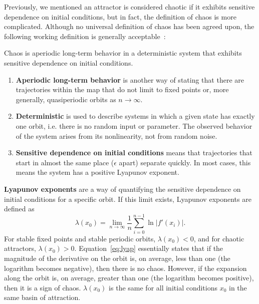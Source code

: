 Previously, we mentioned an attractor is considered chaotic if it
exhibits sensitive dependence on initial conditions, but in fact, the
definition of chaos is more complicated. Although no universal definition of chaos has been
agreed upon, the following working definition is generally acceptable~\cite{strogatz}:
\begin{singlespace}
\begin{definition}
Chaos is aperiodic long-term behavior in a deterministic
  system that exhibits sensitive dependence on initial conditions.
\end{definition}
\end{singlespace}
\begin{enumerate}
\item \textbf{Aperiodic long-term behavior} is another way of stating
  that there are trajectories within the map that do not limit to
  fixed points or, more generally, quasiperiodic orbits as $n \to \infty$.
\item \textbf{Deterministic} is used to describe systems in which a
  given state has exactly one orbit, i.e. there is no random input or parameter. The observed behavior of the
  system arises from its nonlinearity, not from random noise.
\item \textbf{Sensitive dependence on initial conditions} means that
  trajectories that start in almost the same place ($\epsilon$ apart)
  separate quickly. In most cases, this means the system has a
  positive Lyapunov exponent.
\end{enumerate}

\textbf{Lyapunov exponents} are a way of quantifying the sensitive
dependence on initial conditions for a specific orbit. If this limit
exists, Lyapunov exponents are defined as 
\begin{equation}\label{eq:lyap}
\lambda(x_0) = \lim_{n \to \infty} \frac{1}{n} \sum_{i=0}^{n-1} \ln |f'(x_i)|.
\end{equation}
For stable fixed points and stable periodic orbits, $\lambda(x_0) < 0$,
and for chaotic attractors, $\lambda(x_0)>0$. Equation~\ref{eq:lyap} essentially states that if the magnitude of the
derivative on the orbit is, on average, less than one (the logarithm
becomes negative), then there is no chaos. However, if the expansion
along the orbit is, on average, greater than one (the logarithm becomes positive), then it is a
sign of chaos. $\lambda(x_0)$ is the same for all initial conditions
$x_0$ in the same basin of attraction. 

